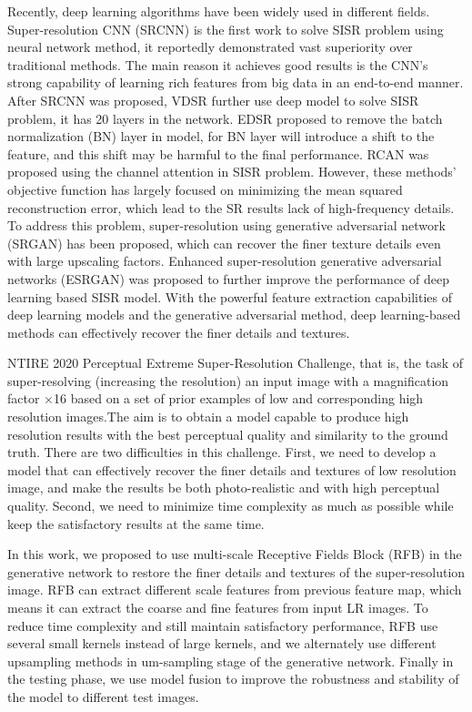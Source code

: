 \documentclass[10pt,twocolumn,letterpaper]{article}
\begin{document}
Recently, deep learning algorithms have been widely used in different fields.  Super-resolution CNN (SRCNN) \cite{dong2014learning} is the first work to solve SISR problem using neural network method, it reportedly demonstrated vast superiority over traditional methods. The main reason it achieves good results is the CNN's strong capability of learning rich features from big data in an end-to-end manner. After SRCNN was proposed, VDSR \cite{kim2016accurate} further use deep model to solve SISR problem, it has 20 layers in the network. EDSR \cite{lim2017enhanced} proposed to remove the batch normalization (BN) layer in model, for BN layer will introduce a shift to the feature, and this shift may be harmful to the final performance. RCAN \cite{zhang2018image} was proposed using the channel attention in SISR problem. However, these methods' objective function has largely focused on minimizing the mean squared reconstruction error, which lead to the SR results lack of high-frequency details. To address this problem, super-resolution using generative adversarial network (SRGAN) \cite{ledig2017photo} has been proposed, which can recover the finer texture details even with large upscaling factors. Enhanced super-resolution generative adversarial networks (ESRGAN) \cite{wang2018esrgan} was proposed to further improve the performance of deep learning based SISR model. With the powerful feature extraction capabilities of deep learning models and the generative adversarial method, deep learning-based methods can effectively recover the finer details and textures.

NTIRE 2020 Perceptual Extreme Super-Resolution Challenge, that is, the task of super-resolving (increasing the resolution) an input image with a magnification factor $\times$16 based on a set of prior examples of low and corresponding high resolution images.The aim is to obtain a model capable to produce high resolution results with the best perceptual quality and similarity to the ground truth. There are two difficulties in this challenge. First, we need to develop a model that can effectively recover the finer details and textures of low resolution image, and make the results be both photo-realistic and with high perceptual quality. Second, we need to minimize time complexity as much as possible while keep the satisfactory results at the same time.

In this work, we proposed to use multi-scale Receptive Fields Block (RFB) in the generative network to restore the finer details and textures of the super-resolution image. RFB can extract different scale features from previous feature map, which means it can extract the coarse and fine features from input LR images. To reduce time complexity and still maintain satisfactory performance, RFB use several small kernels instead of large kernels, and we alternately use different upsampling methods in um-sampling stage of the generative network. Finally in the testing phase, we use model fusion to improve the robustness and stability of the model to different test images.
\end{document}
